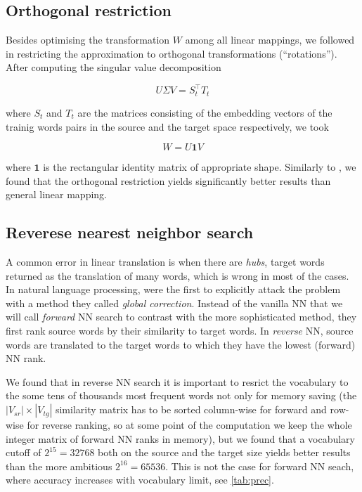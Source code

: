 \documentclass[11pt]{article}
\begin{document}
\subsection{Orthogonal restriction}

Besides optimising the transformation $W$ among all linear mappings, we
followed \cite{Xing:2015} in restricting the approximation to orthogonal
transformations (``rotations''). After computing the singular value
decomposition

\[U\Sigma V=S_t^\top T_t\]

\noindent where $S_t$ and $T_t$ are the matrices consisting of the embedding vectors of
the trainig words pairs in the source and the target space respectively, we
took

\[W=U\mathbf{1}V\]

\noindent where $\mathbf 1$ is the rectangular identity matrix of appropriate shape.
Similarly to \cite{Xing:2015}, we found that the orthogonal restriction yields
significantly better results than general linear mapping.

\subsection{Reverese nearest neighbor search}


A common error in linear translation is when there are \emph{hubs}, target
words returned as the translation of many words, which is wrong in most of the
cases.  In natural language processing, \cite{Dinu:2015} were the first to
explicitly attack the problem with a method they called \emph{global
correction}.  Instead of the vanilla NN that we will call \emph{forward} NN
search to contrast with the more sophisticated method, they first rank source
words by their similarity to target words. In \emph{reverse} NN, source words
are translated to the target words to which they have the lowest (forward) NN
rank.

We found that in reverse NN search it is important to resrict the vocabulary to
the some tens of thousands most frequent words not only for memory saving (the
$|V_{sr}|\times|V_{tg}|$ similarity matrix has to be sorted column-wise for
forward and row-wise for reverse ranking, so at some point of the computation
we keep the whole integer matrix of forward NN ranks in memory), but we found
that a vocabulary cutoff of $2^{15}=32768$ both on the source and the target
size yields better results than the more ambitious $2^{16}=65536$. This is not
the case for forward NN seach, where accuracy increases with vocabulary limit,
see \cref{tab:prec}.
\end{document}
